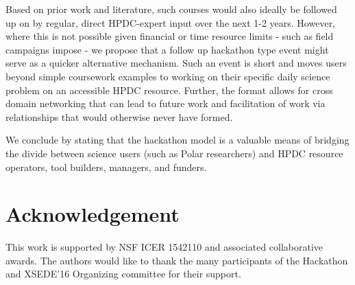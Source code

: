\documentclass[conference]{IEEEtran}
\begin{document}
Based on prior work and literature, such courses would also ideally be followed up on by regular, direct HPDC-expert input over the next 1-2 years.  However, where this is not possible given financial or time resource limits - such as field campaigns impose - we propose that a follow up hackathon type event might serve as a quicker alternative mechanism. Such an event is short and moves users beyond simple coursework examples to working on their specific daily science problem on an accessible HPDC resource. Further, the format allows for cross domain networking that can lead to future work and facilitation of work via relationships that would otherwise never have formed.

We conclude by stating that the hackathon model is a valuable means of bridging the divide between science users (such as Polar researchers) and HPDC resource operators, tool builders, managers, and funders.  



\section*{Acknowledgement}
This work is supported by NSF ICER 1542110 and associated collaborative
awards. The authors would like to thank the many participants of the Hackathon
and XSEDE'16 Organizing committee for their support.






%
%
%
%



\end{document}
